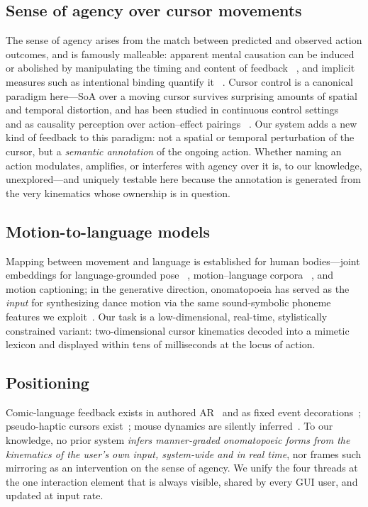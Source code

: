 \documentclass[sigconf,nonacm]{acmart}
\begin{document}
\subsection{Sense of agency over cursor movements}
The sense of agency arises from the match between predicted and observed action outcomes, and is famously malleable: apparent mental causation can be induced or abolished by manipulating the timing and content of feedback ~\cite{wegner1999}, and implicit measures such as intentional binding quantify it ~\cite{haggard2002}. Cursor control is a canonical paradigm here---SoA over a moving cursor survives surprising amounts of spatial and temporal distortion, and has been studied in continuous control settings ~\cite{wen2015} and as causality perception over action--effect pairings ~\cite{kawabe2013}. Our system adds a new kind of feedback to this paradigm: not a spatial or temporal perturbation of the cursor, but a \emph{semantic annotation} of the ongoing action. Whether naming an action modulates, amplifies, or interferes with agency over it is, to our knowledge, unexplored---and uniquely testable here because the annotation is generated from the very kinematics whose ownership is in question.

\subsection{Motion-to-language models}
Mapping between movement and language is established for human bodies---joint embeddings for language-grounded pose ~\cite{ahuja2019language2pose}, motion--language corpora ~\cite{plappert2016kit}, and motion captioning; in the generative direction, onomatopoeia has served as the \emph{input} for synthesizing dance motion via the same sound-symbolic phoneme features we exploit~\cite{okamura2023dance}. Our task is a low-dimensional, real-time, stylistically constrained variant: two-dimensional cursor kinematics decoded into a mimetic lexicon and displayed within tens of milliseconds at the locus of action.

\subsection{Positioning}
Comic-language feedback exists in authored AR~\cite{bhatia2024comics} and as fixed event decorations~\cite{katokatakata}; pseudo-haptic cursors exist~\cite{watanabe2008visualhaptics}; mouse dynamics are silently inferred~\cite{yamauchi2018,arapakis2020}. To our knowledge, no prior system \emph{infers manner-graded onomatopoeic forms from the kinematics of the user's own input, system-wide and in real time}, nor frames such mirroring as an intervention on the sense of agency. We unify the four threads at the one interaction element that is always visible, shared by every GUI user, and updated at input rate.
\end{document}
